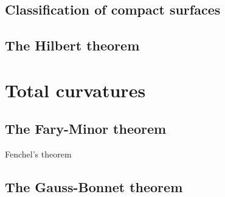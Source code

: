 \documentclass{../note}
\begin{document}
\section{Classification of compact surfaces}
\section{The Hilbert theorem}

\chapter{Total curvatures}
\section{The Fary-Minor theorem}
Fenchel's theorem
\section{The Gauss-Bonnet theorem}
\end{document}
